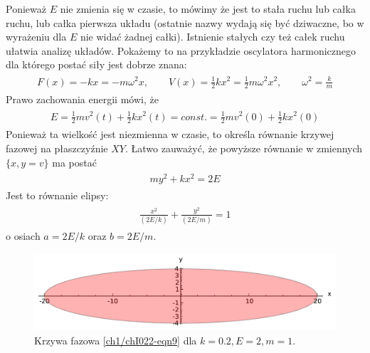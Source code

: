 \documentclass[a4paper,12pt,polish]{sphinxmanual}
\begin{document}
Ponieważ $E$ nie zmienia się w czasie, to mówimy że jest to stała ruchu lub całka ruchu, lub całka pierwsza układu (ostatnie nazwy wydają  się być dziwaczne, bo w wyrażeniu dla $E$ nie widać żadnej całki).  Istnienie stałych czy też całek ruchu ułatwia analizę układów. Pokażemy to na przykładzie oscylatora harmonicznego  dla którego postać siły jest dobrze znana:
\label{ch1/chI022:equation-eqn6}\begin{gather}
\begin{split}F(x) = - k x = - m\omega^2 x, \qquad V(x) = \frac{1}{2} k  x^2  = \frac{1}{2} m\omega^2 x^2, \qquad \omega^2 = \frac{k}{m}\end{split}\label{ch1/chI022-eqn6}
\end{gather}
Prawo zachowania energii mówi, że
\label{ch1/chI022:equation-eqn7}\begin{gather}
\begin{split}E = \frac{1}{2} m v^2(t) + \frac{1}{2} k x^2(t) = const. = \frac{1}{2} m v^2(0) + \frac{1}{2} k x^2(0)\end{split}\label{ch1/chI022-eqn7}
\end{gather}
Ponieważ ta wielkość jest niezmienna w czasie, to określa równanie krzywej fazowej na płaszczyźnie $XY$. Łatwo zauważyć, że powyższe równanie w zmiennych $\{x, y=v\}$ ma postać
\label{ch1/chI022:equation-eqn8}\begin{gather}
\begin{split} m y^2 +  k x^2 =  2E\end{split}\label{ch1/chI022-eqn8}
\end{gather}
Jest to równanie elipsy:
\label{ch1/chI022:equation-eqn9}\begin{gather}
\begin{split}\frac{x^2}{(2E/k)} + \frac{y^2}{(2E/m)} = 1\end{split}\label{ch1/chI022-eqn9}
\end{gather}
o osiach $a=2E/k$ oraz $b=2E/m$.
\begin{figure}[htbp]
\centering
\capstart

\includegraphics{sage_chI022_01.pdf}
\caption{Krzywa fazowa \eqref{ch1/chI022-eqn9} dla $k=0.2, E=2, m=1$.}\end{figure}
\end{document}
